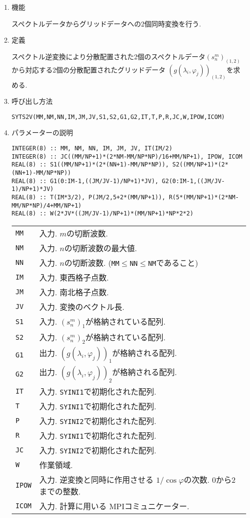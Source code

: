 \documentclass[a4j]{jsarticle}
\begin{document}
\begin{enumerate}

\item 機能

スペクトルデータからグリッドデータへの2個同時変換を行う.

\item 定義

スペクトル逆変換により分散配置された2個のスペクトルデータ$(s^m_n)_{(1,2)}$
から対応する2個の分散配置されたグリッドデータ
$(g(\lambda_i,\varphi_j))_{(1,2)}$を求める.

  
\item 呼び出し方法 

\texttt{SYTS2V(MM,NM,NN,IM,JM,JV,S1,S2,G1,G2,IT,T,P,R,JC,W,IPOW,ICOM)}
  
\item パラメーターの説明

\begin{verbatim}        
INTEGER(8) :: MM, NM, NN, IM, JM, JV, IT(IM/2)
INTEGER(8) :: JC((MM/NP+1)*(2*NM-MM/NP*NP)/16+MM/NP+1), IPOW, ICOM
REAL(8) :: S1((MM/NP+1)*(2*(NN+1)-MM/NP*NP)), S2((MM/NP+1)*(2*(NN+1)-MM/NP*NP))
REAL(8) :: G1(0:IM-1,((JM/JV-1)/NP+1)*JV), G2(0:IM-1,((JM/JV-1)/NP+1)*JV)
REAL(8) :: T(IM*3/2), P(JM/2,5+2*(MM/NP+1)), R(5*(MM/NP+1)*(2*NM-MM/NP*NP)/4+MM/NP+1)
REAL(8) :: W(2*JV*((JM/JV-1)/NP+1)*(MM/NP+1)*NP*2*2)
\end{verbatim}      

\begin{tabular}{ll}
\texttt{MM} & 入力. $m$の切断波数.\\
\texttt{NM} & 入力. $n$の切断波数の最大値.\\
\texttt{NN} & 入力. $n$の切断波数.
(\texttt{MM}$\le$\texttt{NN}$\le$\texttt{NM}であること)\\
\texttt{IM} & 入力. 東西格子点数.\\
\texttt{JM} & 入力. 南北格子点数.\\
\texttt{JV} & 入力. 変換のベクトル長.\\
\texttt{S1} & 入力. $(s^m_n)_1$が格納されている配列.\\
\texttt{S2} & 入力. $(s^m_n)_2$が格納されている配列.\\
\texttt{G1} & 出力. $(g(\lambda_i,\varphi_j))_1$が格納される配列.\\
\texttt{G2} & 出力. $(g(\lambda_i,\varphi_j))_2$が格納される配列.\\
\texttt{IT} & 入力. \texttt{SYINI1}で初期化された配列.\\
\texttt{T} & 入力. \texttt{SYINI1}で初期化された配列.\\
\texttt{P}  & 入力. \texttt{SYINI2}で初期化された配列.\\
\texttt{R}  & 入力. \texttt{SYINI1}で初期化された配列.\\
\texttt{JC}  & 入力. \texttt{SYINI2}で初期化された配列.\\
\texttt{W} & 作業領域.\\
\texttt{IPOW} & 入力. 逆変換と同時に作用させる
                      $1/\cos\varphi$の次数. 0から2までの整数.\\
\texttt{ICOM} & 入力. 計算に用いる MPIコミュニケーター.
\end{tabular}


\end{enumerate}
\end{document}

